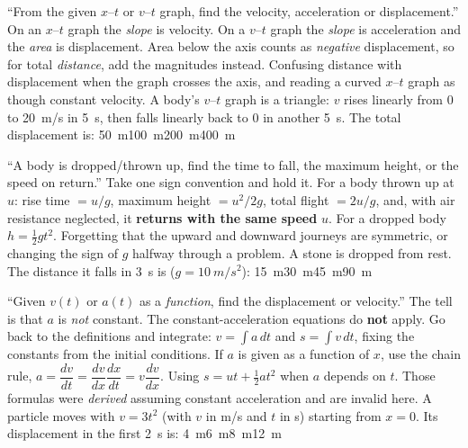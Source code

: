 {``From the given $x$--$t$ or $v$--$t$ graph, find the velocity, acceleration or displacement.''}
{On an $x$--$t$ graph the \emph{slope} is velocity. On a $v$--$t$ graph the \emph{slope} is acceleration
and the \emph{area} is displacement. Area below the axis counts as \emph{negative} displacement, so
for total \emph{distance}, add the magnitudes instead.}
{Confusing distance with displacement when the graph crosses the axis, and reading a curved $x$--$t$
graph as though constant velocity.}
{A body's $v$--$t$ graph is a triangle: $v$ rises linearly from $0$ to \SI{20}{m/s} in \SI{5}{s}, then
falls linearly back to $0$ in another \SI{5}{s}. The total displacement is:}
{\SI{50}{m}}{\SI{100}{m}}{\SI{200}{m}}{\SI{400}{m}}

{``A body is dropped/thrown up, find the time to fall, the maximum height, or the speed on
return.''}
{Take one sign convention and hold it. For a body thrown up at $u$: rise time $=u/g$, maximum height
$=u^2/2g$, total flight $=2u/g$, and, with air resistance neglected, it \textbf{returns with the same
speed} $u$. For a dropped body
$h=\tfrac12gt^2$.}
{Forgetting that the upward and downward journeys are symmetric, or changing the sign of $g$ halfway
through a problem.}
{A stone is dropped from rest. The distance it falls in \SI{3}{s} is ($g=\SI{10}{m/s^2}$):}
{\SI{15}{m}}{\SI{30}{m}}{\SI{45}{m}}{\SI{90}{m}}

{``Given $v(t)$ or $a(t)$ as a \emph{function}, find the displacement or velocity.'' The tell is that
$a$ is \emph{not} constant.}
{The constant-acceleration equations do \textbf{not} apply. Go back to the definitions and integrate:
$v=\int a\,dt$ and $s=\int v\,dt$, fixing the constants from the initial conditions. If $a$ is given as a
function of $x$, use the chain rule,
$a=\dfrac{dv}{dt}=\dfrac{dv}{dx}\dfrac{dx}{dt}=v\dfrac{dv}{dx}$.}
{Using $s=ut+\tfrac12at^2$ when $a$ depends on $t$. Those formulas were \emph{derived} assuming constant
acceleration and are invalid here.}
{A particle moves with $v=3t^2$ (with $v$ in \si{m/s} and $t$ in \si{s}) starting from $x=0$. Its displacement in the first \SI{2}{s} is:}
{\SI{4}{m}}{\SI{6}{m}}{\SI{8}{m}}{\SI{12}{m}}
